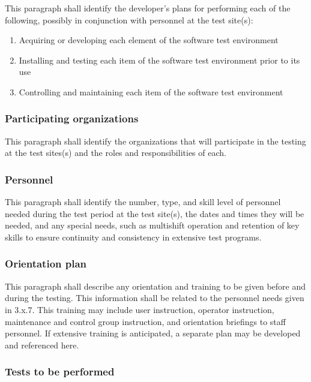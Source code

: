 \documentclass{fidata-report-template}
\begin{document}
This paragraph shall identify the developer's plans for performing each
of the following, possibly in conjunction with personnel at the test
site(s):

\begin{enumerate}
\itemsep1pt\parskip0pt
\item
  Acquiring or developing each element of the software test environment
\item
  Installing and testing each item of the software test environment
  prior to its use
\item
  Controlling and maintaining each item of the software test environment
\end{enumerate}

\subsubsection{Participating organizations}

This paragraph shall identify the organizations that will participate in
the testing at the test sites(s) and the roles and responsibilities of
each.

\subsubsection{Personnel}

This paragraph shall identify the number, type, and skill level of
personnel needed during the test period at the test site(s), the dates
and times they will be needed, and any special needs, such as multishift
operation and retention of key skills to ensure continuity and
consistency in extensive test programs.

\subsubsection{Orientation plan}

This paragraph shall describe any orientation and training to be given
before and during the testing. This information shall be related to the
personnel needs given in 3.x.7. This training may include user
instruction, operator instruction, maintenance and control group
instruction, and orientation briefings to staff personnel. If extensive
training is anticipated, a separate plan may be developed and referenced
here.

\subsubsection{Tests to be performed}
\end{document}
